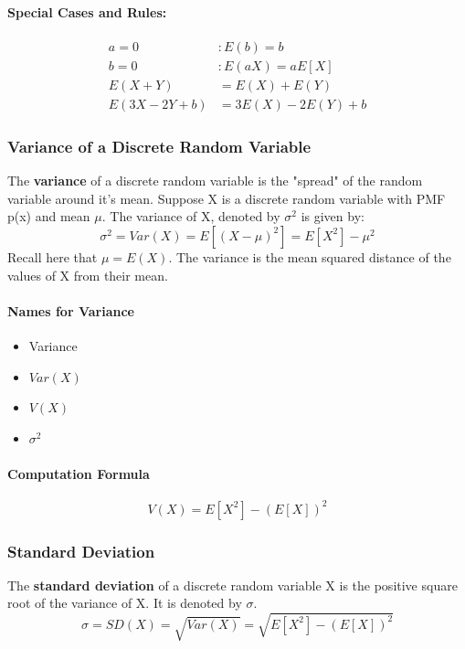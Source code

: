 \paragraph*{Special Cases and Rules:}
\begin{align*}
    a = 0 &: E(b) = b \\
    b = 0 &: E(aX) = aE[X] \\
    E(X + Y) &= E(X) + E(Y) \\
    E(3X - 2Y + b) &= 3E(X) - 2E(Y) + b
\end{align*}

\subsubsection*{Variance of a Discrete Random Variable}
\vspace{5mm}
The \textbf{variance} of a discrete random variable is the "spread" of the random variable around it's mean.
Suppose X is a discrete random variable with PMF p(x) and mean $\mu$. The variance of X, denoted by $\sigma^2$ is given by:
\[
    \sigma^2 =Var(X) = E[(X - \mu)^2] = E[X^2] - \mu^2
\]
Recall here that $\mu = E(X)$. The variance is the mean squared distance of the values of X from their mean.

\pagebreak

\paragraph*{Names for Variance}
\begin{itemize}
    \item Variance
    \item $Var(X)$
    \item $V(X)$
    \item $\sigma^2$
\end{itemize}

\paragraph*{Computation Formula}
\[
    V(X) = E[X^2] - (E[X])^2
\]

\subsubsection*{Standard Deviation}
\vspace{5mm}
The \textbf{standard deviation} of a discrete random variable X is the positive square root of the variance of X. It is denoted by $\sigma$.
\[
    \sigma = SD(X) = \sqrt{Var(X)} = \sqrt{E[X^2] - (E[X])^2}
\]


